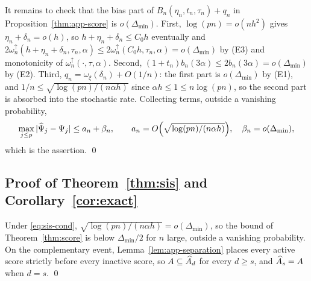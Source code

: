 It remains to check that the bias part of $B_n(\eta_n,t_n,\tau_n)+q_n$ in
Proposition~\ref{thm:app-score} is
$o(\Delta_{\min})$.  First, $\log(pn)=o(nh^2)$ gives
$\eta_n+\delta_n=o(h)$, so $h+\eta_n+\delta_n\le C_0h$ eventually and
$2\omega_n^{\uparrow}(h+\eta_n+\delta_n,\tau_n,\alpha)\le2\omega_n^{\uparrow}(C_0h,\tau_n,\alpha)
=o(\Delta_{\min})$ by (E3) and monotonicity of
$\omega_n^{\uparrow}(\cdot,\tau,\alpha)$.  Second,
$(1+t_n)b_n(3\alpha)\le2b_n(3\alpha)=o(\Delta_{\min})$ by (E2).  Third,
$q_n=\omega_\xi(\delta_n)+O(1/n)$: the first part is
$o(\Delta_{\min})$ by (E1), and
$1/n\le\sqrt{\log(pn)/(n\alpha h)}$ since $\alpha h\le1\le n\log(pn)$, so
the second part is absorbed into the stochastic rate.  Collecting terms,
outside a vanishing probability,
\[
 \max_{j\le p}|\widehat\Psi_j-\Psi_j|
 \le a_n+\beta_n,\qquad
 a_n=O\Bigl(\sqrt{\log(pn)/(n\alpha h)}\Bigr),\quad
 \beta_n=o(\Delta_{\min}),
\]
which is the assertion.  \qed

\subsection{Proof of Theorem~\ref{thm:sis} and
Corollary~\ref{cor:exact}}

Under \eqref{eq:sis-cond},
$\sqrt{\log(pn)/(n\alpha h)}=o(\Delta_{\min})$, so the bound of
Theorem~\ref{thm:score} is below $\Delta_{\min}/2$ for $n$ large,
outside a vanishing probability.  On the complementary event,
Lemma~\ref{lem:app-separation} places every active score strictly before
every inactive score, so $A\subseteq\widehat{A}_d$ for every $d\ge s$,
and $\widehat{A}_s=A$ when $d=s$.  \qed
